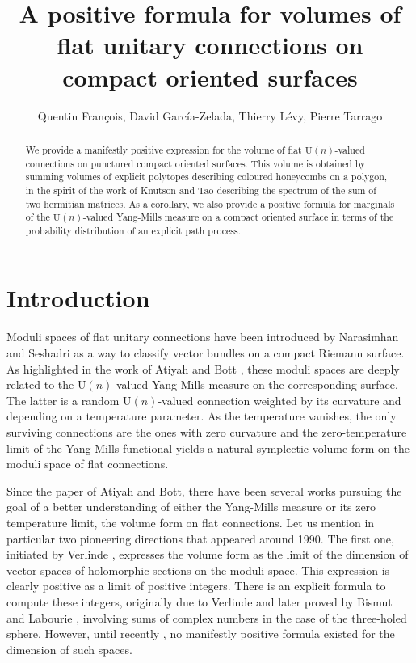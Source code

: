 \documentclass[11pt,a4paper]{amsart}
\title[Positive Formula for Volumes of Flat Unitary Connections]{A positive formula for volumes of flat unitary connections on compact oriented surfaces}
\author{Quentin François, David García-Zelada, Thierry Lévy, Pierre Tarrago}
\providecommand{\U}{\mathrm U}
\numberwithin{equation}{section}
\theoremstyle{definition}
\begin{document}
\begin{abstract}
We provide a manifestly positive expression for the volume of flat $\U(n)$-valued connections on punctured compact oriented surfaces. This volume is obtained by summing volumes of explicit polytopes describing coloured honeycombs on a polygon, in the spirit of the work of Knutson and Tao describing the spectrum of the sum of two hermitian matrices. As a corollary, we also provide a positive formula for marginals of the $\U(n)$-valued Yang-Mills measure on a compact oriented surface in terms of the probability distribution of an explicit path process.
\end{abstract}

\maketitle

\section{Introduction}

Moduli spaces of flat unitary connections have been introduced by Narasimhan and Seshadri \cite{Narasimhan_Seshadri,donaldson1983new} 
as a way to classify vector bundles on a compact Riemann surface. As highlighted in the work of Atiyah and Bott \cite{Atiyah_Bott}, 
these  moduli spaces are deeply related to the $\U(n)$-valued Yang-Mills measure on the corresponding surface. 
The latter is a random $\U(n)$-valued connection weighted by its curvature and depending on a temperature parameter. As the temperature vanishes, the only surviving connections are the ones with zero curvature and the zero-temperature limit of the Yang-Mills functional yields a natural symplectic volume form on the moduli 
space of flat connections.

Since the paper of Atiyah and Bott, there have been several works pursuing the goal of a better understanding of either the Yang-Mills 
measure or its zero temperature limit, the volume form on flat connections. Let us mention in particular two pioneering directions that appeared around 1990. 
The first one, initiated by Verlinde \cite{Verlinde}, expresses the volume form as the limit of the dimension of vector spaces of holomorphic sections on the moduli space. 
This expression is clearly positive as a limit of positive integers. 
There is an explicit formula 
to compute these integers, originally due to Verlinde and later proved by Bismut and Labourie \cite{bismut5symplectic}, involving sums of complex numbers in the case of the three-holed sphere. However, until recently \cite{Buch_Kresch_Purbhoo_Tamvakis}, no manifestly positive formula existed for the dimension of such spaces.  
\end{document}
